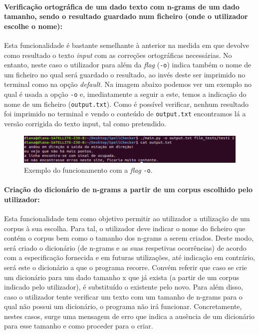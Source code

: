\documentclass{article}
\begin{document}
\paragraph{Verificação ortográfica de um dado texto com n-grams de um dado tamanho, sendo o resultado guardado num ficheiro (onde o utilizador escolhe o nome):} 
Esta funcionalidade é bastante semelhante à anterior na medida em que devolve como resultado o texto \textit{input} com as correções ortográficas necessárias. No entanto, neste caso o utilizador para além da \textit{flag} (\texttt{-o}) indica também o nome de um ficheiro no qual será guardado o resultado, ao invés deste ser imprimido no terminal como na opção \textit{default}. Na imagem abaixo podemos ver um exemplo no qual é usada a opção \texttt{-o} e, imediatamente a seguir a este, temos a indicação do nome de um ficheiro (\texttt{output.txt}). Como é possível verificar, nenhum resultado foi imprimido no terminal e vendo o conteúdo de \texttt{output.txt} encontramos lá a versão corrigida do texto input, tal como pretendido.

\begin{figure}[H]
\begin{center}
    \includegraphics[width = 16cm, keepaspectratio]{Pictures/o.png}
    \caption{Exemplo do funcionamento com a \textit{flag} \texttt{-o}. }
\end{center}
\end{figure}

\paragraph{Criação do dicionário de n-grams a partir de um corpus escolhido pelo utilizador:} 
Esta funcionalidade tem como objetivo permitir ao utilizador a utilização de um corpus à sua escolha. Para tal, o utilizador deve indicar o nome do ficheiro que contém o corpus bem como o tamanho dos n-grams a serem criados. Deste modo, será criado o dicionário (de n-grams e as suas respetivas ocorrências) de acordo com a especificação fornecida e em futuras utilizações, até indicação em contrário, será este o dicionário a que o programa recorre. Convém referir que caso se crie um dicionário para um dado tamanho x que já exista (a partir de um corpus indicado pelo utilizador), é substituído o existente pelo novo. Para além disso, caso o utilizador tente verificar um texto com um tamanho de n-grams para o qual não possui um dicionário, o programa não irá funcionar. Concretamente, nestes casos, surge uma mensagem de erro que indica a ausência de um dicionário para esse tamanho e como proceder para o criar.
\end{document}
